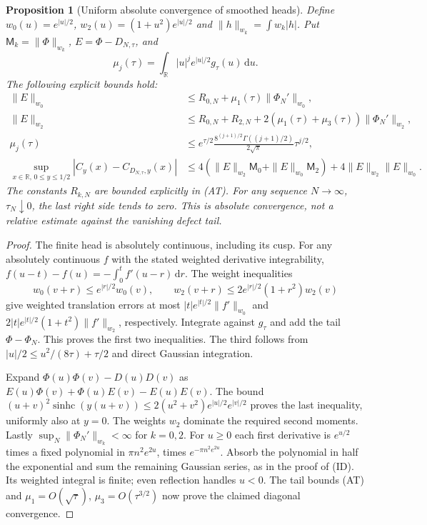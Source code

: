 \documentclass[11pt]{article}
\newtheorem{proposition}[theorem]{Proposition}
\theoremstyle{remark}\newtheorem{remark}[theorem]{Remark}
\newcommand{\R}{\mathbb R}
\newcommand{\dd}{\,\mathrm d}
\newcommand{\sinhc}{\operatorname{sinhc}}
\begin{document}
\begin{proposition}[Uniform absolute convergence of smoothed heads]
\label{prop:gaussian-transfer}
Define $w_0(u)=e^{|u|/2}$, $w_2(u)=(1+u^2)e^{|u|/2}$ and
$\|h\|_{w_k}=\int w_k|h|$. Put $\mathsf M_k=\|\Phi\|_{w_k}$,
$E=\Phi-D_{N,\tau}$, and
\[
 \mu_j(\tau)=\int_\R |u|^j e^{|u|/2}g_\tau(u)\dd u.
\]
The following explicit bounds hold:
\[
 \begin{split}
 \|E\|_{w_0}&\le R_{0,N}+\mu_1(\tau)\|\Phi_N'\|_{w_0},\\
 \|E\|_{w_2}&\le R_{0,N}+R_{2,N}
       +2(\mu_1(\tau)+\mu_3(\tau))\|\Phi_N'\|_{w_2},\\
 \mu_j(\tau)&\le e^{\tau/2}
   \frac{8^{(j+1)/2}\Gamma((j+1)/2)}{2\sqrt\pi}\tau^{j/2},\\
 \sup_{x\in\R,\,0\le y\le1/2}|C_y(x)-C_{D_{N,\tau},y}(x)|
 &\le4(\|E\|_{w_2}\mathsf M_0+\|E\|_{w_0}\mathsf M_2)
                       +4\|E\|_{w_2}\|E\|_{w_0}.
 \end{split}                                               \tag{GT}
\]
The constants $R_{k,N}$ are bounded explicitly in (AT).
For any sequence $N\to\infty$, $\tau_N\downarrow0$, the last
right side tends to zero. This is absolute convergence, not a
relative estimate against the vanishing defect tail.
\end{proposition}
\begin{proof}
The finite head is absolutely continuous, including its cusp.
For any absolutely continuous $f$ with the stated weighted
derivative integrability,
$f(u-t)-f(u)=-\int_0^t f'(u-r)\dd r$.
The weight inequalities
\[
 w_0(v+r)\le e^{|r|/2}w_0(v),\qquad
 w_2(v+r)\le2e^{|r|/2}(1+r^2)w_2(v)
\]
give weighted translation errors at most
$|t|e^{|t|/2}\|f'\|_{w_0}$ and
$2|t|e^{|t|/2}(1+t^2)\|f'\|_{w_2}$, respectively.
Integrate against $g_\tau$ and add the tail $\Phi-\Phi_N$.
This proves the first two inequalities. The third follows from
$|u|/2\le u^2/(8\tau)+\tau/2$ and direct Gaussian integration.

Expand $\Phi(u)\Phi(v)-D(u)D(v)$ as
$E(u)\Phi(v)+\Phi(u)E(v)-E(u)E(v)$.
The bound $(u+v)^2\sinhc(y(u+v))\le
2(u^2+v^2)e^{|u|/2}e^{|v|/2}$ proves the last inequality,
uniformly also at $y=0$. The weights $w_2$ dominate the
required second moments.
Lastly $\sup_N\|\Phi_N'\|_{w_k}<\infty$ for $k=0,2$.
For $u\ge0$ each first derivative is $e^{u/2}$ times a
fixed polynomial in $\pi n^2e^{2u}$, times $e^{-\pi n^2e^{2u}}$.
Absorb the polynomial in half the exponential and sum the
remaining Gaussian series, as in the proof of (ID).
Its weighted integral is finite; even reflection handles $u<0$.
The tail bounds (AT) and $\mu_1=O(\sqrt\tau)$,
$\mu_3=O(\tau^{3/2})$ now prove the claimed diagonal convergence.
\end{proof}
\end{document}
